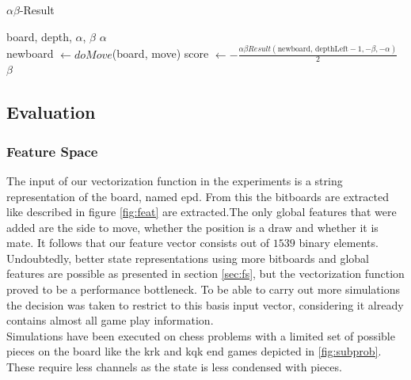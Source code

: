 \begin{algorithm}
\caption{$\alpha \beta$-Result}
\label{al:alphabeta_outcome}
\begin{algorithmic}[]
\REQUIRE board, depth, $\alpha$, $\beta$
\ENSURE $\alpha$\\
\ELSE
{}
\STATE newboard $\leftarrow doMove$(board, move)
\STATE score $\leftarrow -\frac{\alpha \beta Result(\text{newboard, depthLeft} - 1,-\beta,-\alpha)}{2}$
\RETURN $\beta$
\ENDIF
{}
\ENDIF
\ENDFOR
\ENDIF
\end{algorithmic}
\end{algorithm}


\subsection{Evaluation}
\label{subsec:exp_eval}

\subsubsection*{Feature Space}
The input of our vectorization function in the experiments is a string representation of the board, named \gls{epd}. From this the bitboards are extracted like described in figure \ref{fig:feat} are extracted.The only global features that were added are the side to move, whether the position is a draw and whether it is mate. It follows that our feature vector consists out of $1539$ binary elements. Undoubtedly, better state representations using more bitboards and global features are possible  as presented in section \ref{sec:fs}, but the vectorization function proved to be a performance bottleneck. To be able to carry out more simulations the decision was taken to restrict to this basis input vector, considering it already contains almost all game play information.\\

Simulations have been executed on chess problems with a limited set of possible pieces on the board like the \gls{krk} and \gls{kqk} end games depicted in \ref{fig:subprob}. These require less channels as the state is less condensed with pieces. 

